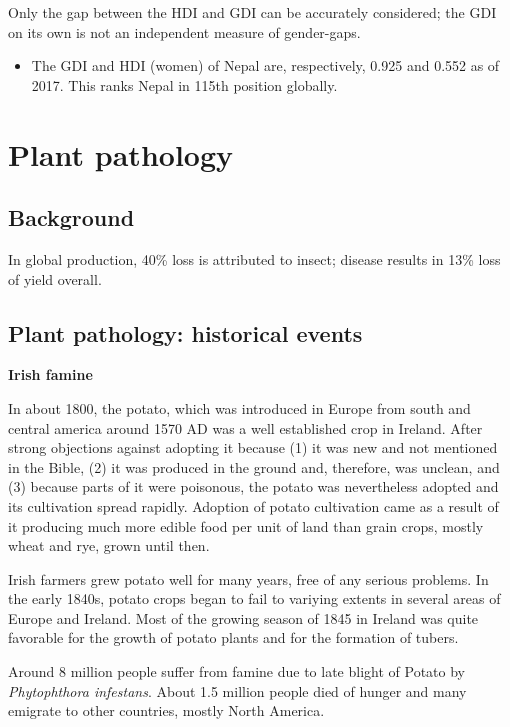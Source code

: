 \documentclass[
  openany]{book}
\providecommand{\tightlist}{%
  \setlength{\itemsep}{0pt}\setlength{\parskip}{0pt}}
\begin{document}
Only the gap between the HDI and GDI can be accurately considered; the GDI on its own is not an independent measure of gender-gaps.

\begin{itemize}
\tightlist
\item
  The GDI and HDI (women) of Nepal are, respectively, 0.925 and 0.552 as of 2017. This ranks Nepal in 115th position globally.
\end{itemize}

\hypertarget{plant-pathology}{%
\chapter{Plant pathology}\label{plant-pathology}}

\hypertarget{background}{%
\section{Background}\label{background}}

In global production, 40\% loss is attributed to insect; disease results in 13\% loss of yield overall.

\hypertarget{plant-pathology-historical-events}{%
\section{Plant pathology: historical events}\label{plant-pathology-historical-events}}

\textbf{Irish famine}

In about 1800, the potato, which was introduced in Europe from south and central america around 1570 AD was a well established crop in Ireland. After strong objections against adopting it because (1) it was new and not mentioned in the Bible, (2) it was produced in the ground and, therefore, was unclean, and (3) because parts of it were poisonous, the potato was nevertheless adopted and its cultivation spread rapidly. Adoption of potato cultivation came as a result of it producing much more edible food per unit of land than grain crops, mostly wheat and rye, grown until then.

Irish farmers grew potato well for many years, free of any serious problems. In the early 1840s, potato crops began to fail to variying extents in several areas of Europe and Ireland. Most of the growing season of 1845 in Ireland was quite favorable for the growth of potato plants and for the formation of tubers.

Around 8 million people suffer from famine due to late blight of Potato by \emph{Phytophthora infestans}. About 1.5 million people died of hunger and many emigrate to other countries, mostly North America.
\end{document}
